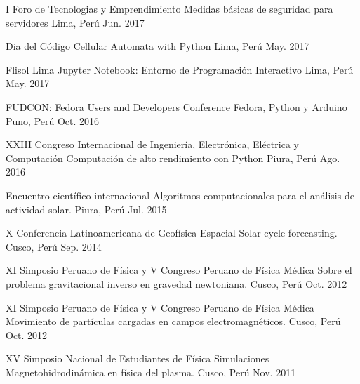 
\begin{cventries}

  \cventry
    {I Foro de Tecnologias y Emprendimiento} %
    {Medidas básicas de seguridad para servidores} %
    {Lima, Perú} %
    {Jun. 2017} %
    {}

  \cventry
    {Dia del Código} %
    {Cellular Automata with Python} %
    {Lima, Perú} %
    {May. 2017} %
    {}

  \cventry
    {Flisol Lima} %
    {Jupyter Notebook: Entorno de Programación Interactivo} %
    {Lima, Perú} %
    {May. 2017} %
    {}

  \cventry
    {FUDCON: Fedora Users and Developers Conference} %
    {Fedora, Python y Arduino} %
    {Puno, Perú} %
    {Oct. 2016} %
    {}

  \cventry
    {XXIII Congreso Internacional de Ingeniería, Electrónica, Eléctrica y Computación} %
    {Computación de alto rendimiento con Python} %
    {Piura, Perú} %
    {Ago. 2016} %
    {}

  \cventry
    {Encuentro científico internacional} %
    {Algoritmos computacionales para el análisis de actividad solar.} %
    {Piura, Perú} %
    {Jul. 2015} %
    {}

  \cventry
    {X Conferencia Latinoamericana de Geofísica Espacial} %
    {Solar cycle forecasting.} %
    {Cusco, Perú} %
    {Sep. 2014} %
    {}

  \cventry
    {XI Simposio Peruano de Física y V Congreso Peruano de Física Médica} %
    {Sobre el problema gravitacional inverso en gravedad newtoniana.} %
    {Cusco, Perú} %
    {Oct. 2012} %
    {}

  \cventry
    {XI Simposio Peruano de Física y V Congreso Peruano de Física Médica} %
    {Movimiento de partículas cargadas en campos electromagnéticos.} %
    {Cusco, Perú} %
    {Oct. 2012} %
    {}

  \cventry
    {XV Simposio Nacional de Estudiantes de Física} %
    {Simulaciones Magnetohidrodinámica en física del plasma.} %
    {Cusco, Perú} %
    {Nov. 2011} %
    {}

\end{cventries}
